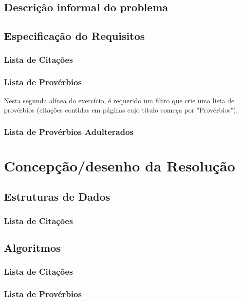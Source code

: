 \documentclass[11pt,a4paper]{report}
\begin{document}
\section{Descrição informal do problema}

\section{Especificação do Requisitos}
\subsection{Lista de Citações}


\subsection{Lista de Provérbios}

Nesta segunda alínea do exercício, é requerido um filtro que crie uma lista de provérbios (citações contidas em páginas cujo título começa por "Provérbios").


\subsection{Lista de Provérbios Adulterados}


\chapter{Concepção/desenho da Resolução}
\label{chap:concepcao}

\section{Estruturas de Dados}
\subsection{Lista de Citações}


\section{Algoritmos}
\subsection{Lista de Citações}


\subsection{Lista de Provérbios}
\end{document}
